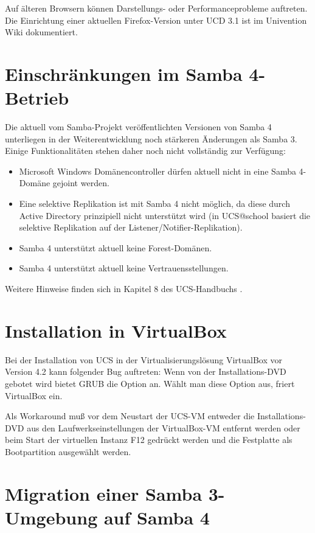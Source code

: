 Auf älteren Browsern können Darstellungs- oder Performanceprobleme
auftreten. Die Einrichtung einer aktuellen Firefox-Version unter UCD
3.1 ist im Univention Wiki \cite{ucd-firefox7} dokumentiert.

\section{Einschränkungen im Samba 4-Betrieb}

Die aktuell vom Samba-Projekt veröffentlichten Versionen von Samba 4
unterliegen in der Weiterentwicklung noch stärkeren Änderungen als Samba
3. Einige Funktionalitäten stehen daher noch nicht vollständig zur Verfügung:

\begin{itemize}
\item Microsoft Windows Domänencontroller dürfen aktuell nicht in eine Samba 4-Domäne
gejoint werden.
\item Eine selektive Replikation ist mit Samba 4 nicht möglich, da diese durch
Active Directory prinzipiell nicht unterstützt wird (in UCS@school
basiert die selektive Replikation auf der Listener/Notifier-Replikation).
\item Samba 4 unterstützt aktuell keine Forest-Domänen. 
\item Samba 4 unterstützt aktuell keine Vertrauensstellungen.
\end{itemize}

Weitere Hinweise finden sich in Kapitel 8 des UCS-Handbuchs \cite{UCS-Handbuch}.

\section{Installation in VirtualBox}
Bei der Installation von UCS in der Virtualisierungslösung VirtualBox vor Version 4.2 kann folgender Bug auftreten:
Wenn von der Installations-DVD gebotet wird bietet
GRUB die Option  an. Wählt man diese Option aus, friert VirtualBox ein.

Als Workaround muß vor dem Neustart der UCS-VM entweder die
Installations-DVD aus den Laufwerkseinstellungen der VirtualBox-VM
entfernt werden oder beim Start der virtuellen Instanz F12 gedrückt
werden und die Festplatte als Bootpartition ausgewählt werden.

\section{Migration einer Samba 3-Umgebung auf Samba 4}
\label{samba-migration}

